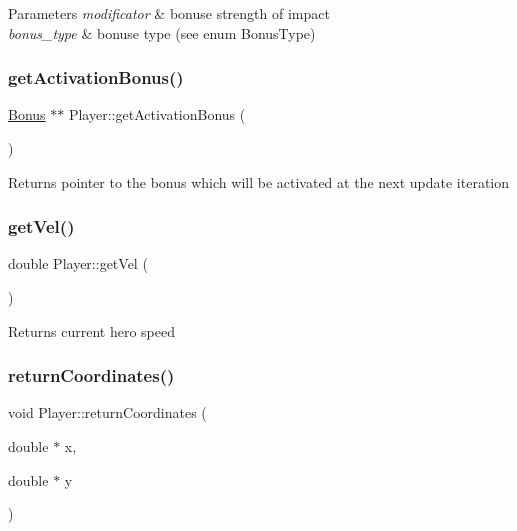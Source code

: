\begin{DoxyParams}{Parameters}
{\em modificator} & bonuse strength of impact \\
\hline
{\em bonus\+\_\+type} & bonuse type (see enum Bonus\+Type) \\
\hline
\end{DoxyParams}
\mbox{\label{class_player_ab62b84f866fb3075bfbf8ea455d73375}} 
\subsubsection{\texorpdfstring{get\+Activation\+Bonus()}{getActivationBonus()}}
{\footnotesize\ttfamily \hyperlink{class_bonus}{Bonus} $\ast$$\ast$ Player\+::get\+Activation\+Bonus (\begin{DoxyParamCaption}{ }\end{DoxyParamCaption})}

\begin{DoxyReturn}{Returns}
pointer to the bonus which will be activated at the next update iteration 
\end{DoxyReturn}
\mbox{\label{class_player_afbabae83ae2b21caf794efa91e26c37d}} 
\subsubsection{\texorpdfstring{get\+Vel()}{getVel()}}
{\footnotesize\ttfamily double Player\+::get\+Vel (\begin{DoxyParamCaption}{ }\end{DoxyParamCaption})}

\begin{DoxyReturn}{Returns}
current hero speed 
\end{DoxyReturn}
\mbox{\label{class_player_ab3d8dc6872a9903ea2717b57d77790a3}} 
\subsubsection{\texorpdfstring{return\+Coordinates()}{returnCoordinates()}}
{\footnotesize\ttfamily void Player\+::return\+Coordinates (\begin{DoxyParamCaption}\item[{double $\ast$}]{x,  }\item[{double $\ast$}]{y }\end{DoxyParamCaption})}

